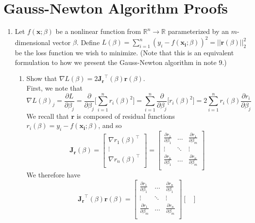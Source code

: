 \documentclass{article}
\begin{document}
\section{Gauss-Newton Algorithm Proofs}
\begin{enumerate}[label=\arabic*.]
\item Let $f(\mathbf{x}; \beta)$ be a nonlinear function from $\mathbb{R}^n \rightarrow \mathbb{R}$ parameterized by an $m$-dimensional vector $\beta$. Define $L(\beta) = \sum_{i=1}^n (y_i - f(\mathbf{x_i}; \beta))^2 = ||\mathbf{r}(\beta)||_2^2$ be the loss function we wish to minimize. (Note that this is an equivalent formulation to how we present the Gauss-Newton algorithm in note 9.)
\begin{enumerate}[label=(\alph*)]
\item Show that $\nabla L(\beta) = 2\mathbf{J_r}^\top(\beta)\mathbf{r}(\beta)$. \\
{\color{blue} First, we note that
$$\nabla L(\beta)_j = \frac{\partial L}{\partial \beta_j} = \frac{\partial}{\partial \beta_j}\big[\sum_{i=1}^n r_i(\beta)^2\big] = \sum_{i=1}^n \frac{\partial}{\partial \beta_j} \big[r_i(\beta)^2\big] = 2\sum_{i=1}^n r_i(\beta) \frac{\partial r_i}{\partial \beta_j}$$ 
We recall that $\mathbf{r}$ is composed of residual functions $r_i(\beta) = y_i - f(\mathbf{x_i}; \beta)$, and so
$$\mathbf{J_r}(\beta) = \begin{bmatrix}
\nabla r_1(\beta)^\top \\
\vdots \\
\nabla r_n(\beta)^\top \\
\end{bmatrix} = \begin{bmatrix}
 \frac{\partial r_1}{\partial \beta_1} & \hdots & \frac{\partial r_1}{\partial \beta_m} \\
 \vdots & \ddots & \vdots \\
 \frac{\partial r_n}{\partial \beta_1} & \hdots & \frac{\partial r_n}{\partial \beta_m} \\
 \end{bmatrix}$$
We therefore have
$$\mathbf{J_r}^\top(\beta)\mathbf{r}(\beta) = \begin{bmatrix}
 \frac{\partial r_1}{\partial \beta_1} & \hdots & \frac{\partial r_n}{\partial \beta_1} \\
 \vdots & \ddots & \vdots \\
\frac{\partial r_1}{\partial \beta_m} & \hdots & \frac{\partial r_n}{\partial \beta_m} \\
  \end{bmatrix}\begin{bmatrix}

\end{bmatrix}$$}
\end{enumerate}
\end{enumerate}
\end{document}
